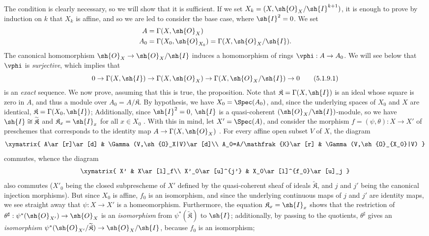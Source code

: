 The condition is clearly necessary, so we will show that it is sufficient.
If we set $X_k=(X,\sh{O}_X/\sh{I}^{k+1})$, it is enough to prove by induction on $k$ that $X_k$ is affine, and so we are led to consider the base case, where $\sh{I}^2=0$.
We set
\begin{align*}
  A&=\Gamma(X,\sh{O}_X)\\
  A_0&=\Gamma(X_0,\sh{O}_{X_0})=\Gamma(X,\sh{O}_X/\sh{I}).
\end{align*}
The canonical homomorphism $\sh{O}_X\to\sh{O}_X/\sh{I}$ induces a homomorphism of rings $\vphi:A\to A_0$.
We will see below that $\vphi$ is \emph{surjective}, which implies that
\[
\label{I.5.1.9.1}
  0\to\Gamma(X,\sh{I})\to\Gamma(X,\sh{O}_X)\to\Gamma(X,\sh{O}_X/\sh{I})\to 0\tag{5.1.9.1}
\]
is an \emph{exact} sequence.
We now prove, assuming that this is true, the proposition.
Note that $\mathfrak{K}=\Gamma(X,\sh{I})$ is an ideal whose square is zero in $A$, and thus a module over $A_0=A/\mathfrak{K}$.
By hypothesis, we have $X_0=\Spec(A_0)$, and, since the underlying spaces of $X_0$ and $X$ are identical, $\mathfrak{K}=\Gamma(X_0,\sh{I})$;
Additionally, since $\sh{I}^2=0$, $\sh{I}$ is a quasi-coherent $(\sh{O}_X/\sh{I})$-module, so we have $\sh{I}\cong\widetilde{\mathfrak{K}}$ and $\mathfrak{K}_x=\sh{I}_x$ for all $x\in X_0$ .
With this in mind, let $X'=\Spec(A)$, and consider the morphism $f=(\psi,\theta):X\to X'$ of preschemes that corresponds to the identity map $A\to\Gamma(X,\sh{O}_X)$ .
For every affine open subset $V$ of $X$, the diagram
\[
  \xymatrix{
    A\ar[r]\ar[d] &
    \Gamma(V,\sh{O}_X|V)\ar[d]\\
    A_0=A/\mathfrak{K}\ar[r] &
    \Gamma(V,\sh{O}_{X_0}|V)
  }
\]
commutes, whence the diagram
\[
  \xymatrix{
    X' &
    X\ar[l]_f\\
    X'_0\ar[u]^{j'} &
    X_0\ar[l]^{f_0}\ar[u]_j
  }
\]
also commutes ($X'_0$ being the closed subprescheme of $X'$ defined by the quasi-coherent sheaf of ideals $\widetilde{\mathfrak{K}}$, and $j$ and $j'$ being the canonical injection morphisms).
But since $X_0$ is affine, $f_0$ is an isomorphism, and since the underlying continuous maps of $j$ and $j'$ are identity maps, we see straight away that $\psi:X\to X'$ is a homeomorphism.
Furthermore, the equation $\mathfrak{K}_x=\sh{I}_x$ shows that the restriction of $\theta^\sharp:\psi^*(\sh{O}_{X'})\to\sh{O}_X$ is an \emph{isomorphism} from $\psi^*(\widetilde{\mathfrak{K}})$ to $\sh{I}$;
additionally, by passing to the quotients, $\theta^\sharp$ gives an \emph{isomorphism} $\psi^*(\sh{O}_{X'}/\widetilde{\mathfrak{K}})\to\sh{O}_X/\sh{I}$, because $f_0$ is an isomorphism;
